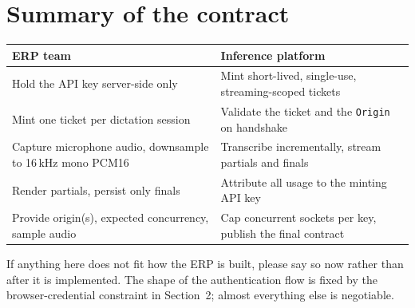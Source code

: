 \documentclass[11pt,a4paper]{article}
\begin{document}
\section{Summary of the contract}

\begin{center}
\renewcommand{\arraystretch}{1.45}
\begin{tabular}{@{}p{7.1cm}p{7.1cm}@{}}
\toprule
{\color{accent}\bfseries ERP team} & {\color{accent}\bfseries Inference platform} \\
\midrule
Hold the API key server-side only &
Mint short-lived, single-use, streaming-scoped tickets \\
Mint one ticket per dictation session &
Validate the ticket and the \texttt{Origin} on handshake \\
Capture microphone audio, downsample to 16\,kHz mono PCM16 &
Transcribe incrementally, stream partials and finals \\
Render partials, persist only finals &
Attribute all usage to the minting API key \\
Provide origin(s), expected concurrency, sample audio &
Cap concurrent sockets per key, publish the final contract \\
\bottomrule
\end{tabular}
\end{center}

\vspace{1.1em}
\noindent
If anything here does not fit how the ERP is built, please say so now rather than after
it is implemented. The shape of the authentication flow is fixed by the
browser-credential constraint in Section~2; almost everything else is negotiable.
\end{document}
